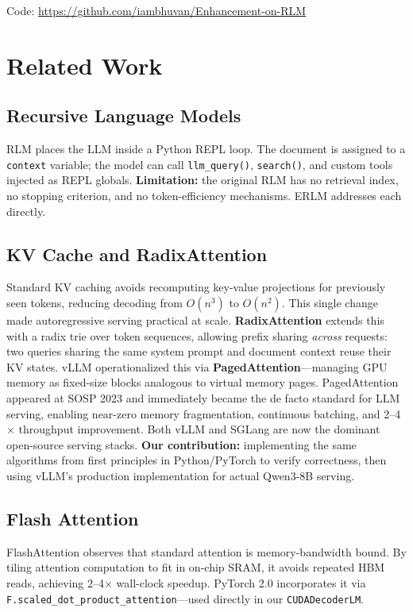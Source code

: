 \documentclass{article}
\begin{document}
Code: \url{https://github.com/iambhuvan/Enhancement-on-RLM}

\section{Related Work}

\subsection{Recursive Language Models}
RLM \citep{zhang2024rlm} places the LLM inside a Python REPL loop. The document is assigned to a \texttt{context} variable; the model can call \texttt{llm\_query()}, \texttt{search()}, and custom tools injected as REPL globals. \textbf{Limitation:} the original RLM has no retrieval index, no stopping criterion, and no token-efficiency mechanisms. ERLM addresses each directly.

\subsection{KV Cache and RadixAttention}
Standard KV caching \citep{pope2022scaling} avoids recomputing key-value projections for previously seen tokens, reducing decoding from $O(n^3)$ to $O(n^2)$. This single change made autoregressive serving practical at scale. \textbf{RadixAttention} \citep{zheng2023sglang} extends this with a radix trie over token sequences, allowing prefix sharing \emph{across} requests: two queries sharing the same system prompt and document context reuse their KV states. vLLM \citep{kwon2023vllm} operationalized this via \textbf{PagedAttention}---managing GPU memory as fixed-size blocks analogous to virtual memory pages. PagedAttention appeared at SOSP 2023 and immediately became the de facto standard for LLM serving, enabling near-zero memory fragmentation, continuous batching, and 2--4$\times$ throughput improvement. Both vLLM and SGLang are now the dominant open-source serving stacks. \textbf{Our contribution:} implementing the same algorithms from first principles in Python/PyTorch to verify correctness, then using vLLM's production implementation for actual Qwen3-8B serving.

\subsection{Flash Attention}
FlashAttention \citep{dao2022flashattention} observes that standard attention is memory-bandwidth bound. By tiling attention computation to fit in on-chip SRAM, it avoids repeated HBM reads, achieving 2--4$\times$ wall-clock speedup. PyTorch 2.0 incorporates it via \texttt{F.scaled\_dot\_product\_attention}---used directly in our \texttt{CUDADecoderLM}.
\end{document}
